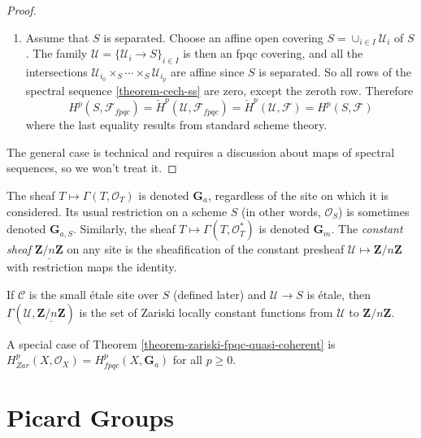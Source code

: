 \begin{proof}
\begin{enumerate}
\item
Assume that $S$ is separated. Choose an affine open covering $S = \cup_{i \in
I} \mathcal{U}_i$ of $S$. The family $\mathcal{U} = \{ \mathcal{U}_i \to S
\}_{i \in I}$ is then an fpqc covering, and all the intersections
$\mathcal{U}_{i_0} \times_S \cdots \times_S \mathcal{U}_{i_p}$ are affine since
$S$ is separated. So all rows of the spectral sequence
\ref{theorem-cech-ss} are zero, except the zeroth row. Therefore
$$
H^p(S, \mathcal{F}_{fpqc}) =
\check H^p(\mathcal{U}, \mathcal{F}_{fpqc}) =
\check H^p(\mathcal{U}, \mathcal{F}) = H^p(S, \mathcal{F})
$$
where the last equality results from standard scheme theory.
\end{enumerate}
The general case is technical and requires a discussion about maps of spectral
sequences, so we won't treat it.
\end{proof}

\begin{definition}
\label{definition-additive-sheaf}
The sheaf $T \mapsto \Gamma(T, \mathcal{O}_T)$ is denoted $\mathbf{G}_a$,
regardless of the site on which it is considered. Its usual restriction on a
scheme $S$ (in other words, $\mathcal{O}_S$) is sometimes denoted
$\mathbf{G}_{a,S}$.
Similarly, the sheaf $T \mapsto \Gamma(T, \mathcal{O}^*_T)$ is denoted
$\mathbf{G}_m$.
The {\it constant sheaf} $\underline{\mathbf{Z}/n\mathbf{Z}}$ on any site is
the sheafification of the constant presheaf $\mathcal{U} \mapsto
\mathbf{Z}/n\mathbf{Z}$ with restriction maps the identity.
\end{definition}

\begin{remark}
\label{remark-constant-locally-constant-maps}
If $\mathcal{C}$ is the small \'etale site over $S$ (defined later) and
$\mathcal{U} \to S$ is \'etale, then $\Gamma(\mathcal{U},
\underline{\mathbf{Z}/n\mathbf{Z}})$ is the set of Zariski locally constant
functions from $\mathcal{U}$ to $\mathbf{Z}/n\mathbf{Z}$.
\end{remark}

\begin{remark}
\label{remark-special-case-fpqc-cohomology-quasi-coherent}
A special case of Theorem \ref{theorem-zariski-fpqc-quasi-coherent}
is $H_{Zar}^p (X, \mathcal{O}_X) = H_{fpqc}^p(X, \mathbf{G}_a)$
for all $p \geq 0$.
\end{remark}




\section{Picard Groups}
\label{section-picard-groups}

